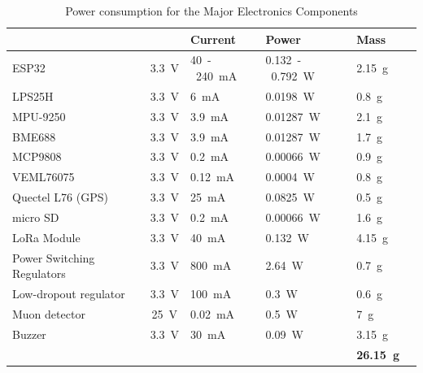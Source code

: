 \begin{table}[htbp]
\centering
{}
\begin{tabular}{>{\raggedright\arraybackslash}p{5cm}c>{\raggedleft\arraybackslash}p{2cm}
>{\raggedleft\arraybackslash}p{3cm}>{\centering\arraybackslash}p{2cm}>{\centering\arraybackslash}p{2cm}}
\hline
\rowcolor{DeepSkyBlue4}
\textbf{\color{white!50}{Component}} & \textbf{\color{white!50}{Voltage}} & \textbf{\color{white!50}\textbf{Current}} & \textbf{\color{white!50}\textbf{Power}} & \textbf{\color{white!50}\textbf{Mass}} \\ \hline
\rowcolors{2}{red}{}
ESP32 & \SI{3.3}{\volt} & \SI{40}-\SI{240}{\milli\ampere} & \SI{0.132}-\SI{0.792}{\watt} & \SI{2.15}{\gram}  \\
\rowcolor{LightCyan1!50}LPS25H & \SI{3.3}{\volt} & \SI{6}{\milli\ampere} & \SI{0.0198}{\watt} & \SI{0.8}{\gram}  \\
MPU-9250 & \SI{3.3}{\volt} & \SI{3.9}{\milli\ampere} &  \SI{0.01287}{\watt} &\SI{2.1}{\gram} \\
\rowcolor{LightCyan1!50}BME688 & \SI{3.3}{\volt} & \SI{3.9}{\milli\ampere} & \SI{0.01287}{\watt} & \SI{1.7}{\gram}  \\
MCP9808 & \SI{3.3}{\volt} & \SI{0.2}{\milli\ampere} &  \SI{0.00066}{\watt} &\SI{0.9}{\gram} \\
\rowcolor{LightCyan1!50}VEML76075 & \SI{3.3}{\volt} & \SI{0.12}{\milli\ampere} &  \SI{0.0004}{\watt} &\SI{0.8}{\gram}  \\
Quectel L76 (GPS) & \SI{3.3}{\volt} &  \SI{25}{\milli\ampere} &  \SI{0.0825}{\watt} & \SI{0.5}{\gram} \\
\rowcolor{LightCyan1!50}micro SD & \SI{3.3}{\volt} & \SI{0.2}{\milli\ampere} &  \SI{0.00066}{\watt} &\SI{1.6}{\gram} \\
LoRa Module & \SI{3.3}{\volt} & \SI{40}{\milli\ampere} &  \SI{0.132}{\watt} &\SI{4.15}{\gram} \\
\rowcolor{LightCyan1!50}Power Switching Regulators & \SI{3.3}{\volt} &\SI{800}{\milli\ampere}&  \SI{2.64}{\watt} &\SI{0.7}{\gram}\\
Low-dropout regulator & \SI{3.3}{\volt} &\SI{100}{\milli\ampere}&  \SI{0.3}{\watt} &\SI{0.6}{\gram}  \\
\rowcolor{LightCyan1!50}Muon detector & \SI{25}{\volt} & \SI{0.02}{\milli\ampere} & \SI{0.5}{\watt} &\SI{7}{\gram} \\ 
Buzzer & \SI{3.3}{\volt} &\SI{30}{\milli\ampere}&  \SI{0.09}{\watt} &\SI{3.15}{\gram}  \\
\rowcolor{DeepSkyBlue4}
\textbf{\color{white!50}{Total Power}} & & & \textbf{\color{white!50}{\SI{4.63}{\watt}}} & \textbf{\color{white!50}\SI{26.15}{\gram}}  \\
\hline
\end{tabular}
\caption{\small{Power consumption for the Major Electronics Components}}
\end{table}


